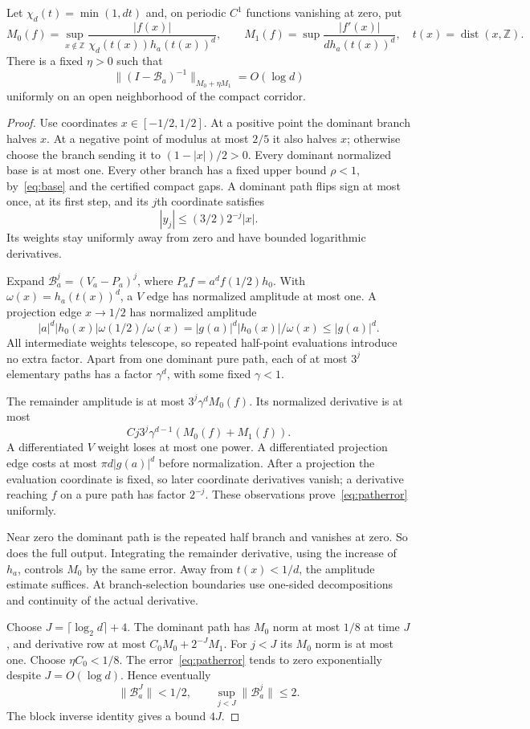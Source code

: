 \documentclass[11pt,a4paper]{article}
\newcommand{\dist}{\operatorname{dist}}\newcommand{\Rea}{\operatorname{Re}}
\begin{document}
\begin{lemma}\label{lem:layer}
Let $\chi_d(t)=\min(1,dt)$ and, on periodic $C^1$ functions vanishing at zero, put
\[
 M_0(f)=\sup_{x\notin\mathbb Z}\frac{|f(x)|}{\chi_d(t(x))h_a(t(x))^d},\qquad
 M_1(f)=\sup\frac{|f'(x)|}{d h_a(t(x))^d},\quad t(x)=\dist(x,\mathbb Z).
\]
There is a fixed $\eta>0$ such that
\[
 \|(I-\mathcal B_a)^{-1}\|_{M_0+\eta M_1}=O(\log d)
\]
uniformly on an open neighborhood of the compact corridor.
\end{lemma}
\begin{proof}
Use coordinates $x\in[-1/2,1/2]$. At a positive point the dominant branch halves $x$. At a negative point of modulus at most $2/5$ it also halves $x$; otherwise choose the branch sending it to $(1-|x|)/2>0$. Every dominant normalized base is at most one. Every other branch has a fixed upper bound $\rho<1$, by~\eqref{eq:base} and the certified compact gaps. A dominant path flips sign at most once, at its first step, and its $j$th coordinate satisfies
\[
 |y_j|\le(3/2)2^{-j}|x|.
\]
Its weights stay uniformly away from zero and have bounded logarithmic derivatives.

Expand $\mathcal B_a^j=(V_a-P_a)^j$, where $P_af=a^df(1/2)h_0$. With $\omega(x)=h_a(t(x))^d$, a $V$ edge has normalized amplitude at most one. A projection edge $x\to1/2$ has normalized amplitude
\[
 |a|^d|h_0(x)|\omega(1/2)/\omega(x)
 =|g(a)|^d|h_0(x)|/\omega(x)\le|g(a)|^d.
\]
All intermediate weights telescope, so repeated half-point evaluations introduce no extra factor. Apart from one dominant pure path, each of at most $3^j$ elementary paths has a factor $\gamma^d$, with some fixed $\gamma<1$.

The remainder amplitude is at most $3^j\gamma^dM_0(f)$. Its normalized derivative is at most
\begin{equation}\label{eq:patherror}
 Cj3^j\gamma^{d-1}(M_0(f)+M_1(f)).
\end{equation}
A differentiated $V$ weight loses at most one power. A differentiated projection edge costs at most $\pi d|g(a)|^d$ before normalization. After a projection the evaluation coordinate is fixed, so later coordinate derivatives vanish; a derivative reaching $f$ on a pure path has factor $2^{-j}$. These observations prove~\eqref{eq:patherror} uniformly.

Near zero the dominant path is the repeated half branch and vanishes at zero. So does the full output. Integrating the remainder derivative, using the increase of $h_a$, controls $M_0$ by the same error. Away from $t(x)<1/d$, the amplitude estimate suffices. At branch-selection boundaries use one-sided decompositions and continuity of the actual derivative.

Choose $J=\lceil\log_2d\rceil+4$. The dominant path has $M_0$ norm at most $1/8$ at time $J$, and derivative row at most $C_0M_0+2^{-J}M_1$. For $j<J$ its $M_0$ norm is at most one. Choose $\eta C_0<1/8$. The error~\eqref{eq:patherror} tends to zero exponentially despite $J=O(\log d)$. Hence eventually
\[
 \|\mathcal B_a^J\|<1/2,\qquad
 \sup_{j<J}\|\mathcal B_a^j\|\le2.
\]
The block inverse identity gives a bound $4J$.
\end{proof}
\end{document}
